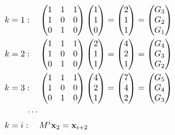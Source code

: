 \documentclass[answers]{exam}
\begin{document}
\begin{questions}
\begin{parts}
\begin{subparts}
\begin{solution}
                \begin{align*}
                    k&=1:\quad \begin{pmatrix}1&1&1\\1&0&0\\0&1&0\end{pmatrix}\begin{pmatrix}1\\1\\0\end{pmatrix}=\begin{pmatrix}2\\1\\1\end{pmatrix}=\begin{pmatrix}G_3\\G_2\\G_1\end{pmatrix}\\
                    k&=2:\quad \begin{pmatrix}1&1&1\\1&0&0\\0&1&0\end{pmatrix}\begin{pmatrix}2\\1\\1\end{pmatrix}=\begin{pmatrix}4\\2\\1\end{pmatrix}=\begin{pmatrix}G_4\\G_3\\G_2\end{pmatrix}\\
                    k&=3:\quad \begin{pmatrix}1&1&1\\1&0&0\\0&1&0\end{pmatrix}\begin{pmatrix}4\\2\\1\end{pmatrix}=\begin{pmatrix}7\\4\\2\end{pmatrix}=\begin{pmatrix}G_5\\G_4\\G_3\end{pmatrix}\\
                    &\qquad\cdots\\
                    k&=i:\quad M^i\bm{\mathrm{x}}_2=\bm{\mathrm{x}}_{i+2}
                \end{align*}


\end{solution}
\end{subparts}
\end{parts}
\end{questions}
\end{document}
